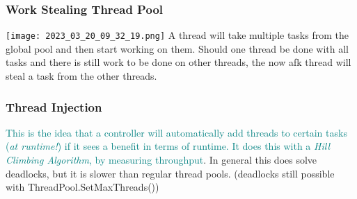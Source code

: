 \documentclass[main.tex,fontsize=8pt,paper=a4,paper=portrait,DIV=calc,]{scrartcl}
\begin{document}
\lstset{
    language=C#,
    style=code,
}

\subsubsection{Work Stealing Thread Pool}
\texttt{[image: 2023\_03\_20\_09\_32\_19.png]}\newline
A thread will take multiple tasks from the global pool and then start working on them.\newline
Should one thread be done with all tasks and there is still work to be done on other threads, the now afk thread will steal a task from the other threads.

\subsubsection{Thread Injection}
\textcolor{teal}{This is the idea that a controller will automatically add threads to certain tasks (\emph{at runtime!}) if it sees a benefit in terms of runtime.\newline
It does this with a \emph{Hill Climbing Algorithm}, by measuring throughput}. \newline
In general this does solve deadlocks, but it is slower than regular thread pools. (deadlocks still possible with ThreadPool.SetMaxThreads())
\end{document}
